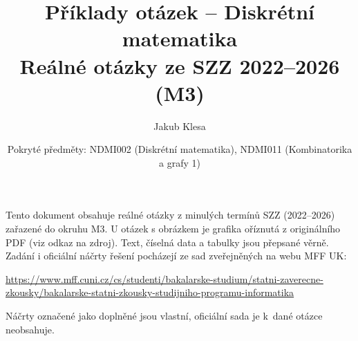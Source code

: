 \documentclass[11pt,a4paper]{article}
\title{Příklady otázek -- Diskrétní matematika\\[0.3em]\large Reálné otázky ze SZZ 2022--2026 (M3)}
\author{Jakub Klesa}
\date{Pokryté předměty: NDMI002 (Diskrétní matematika), NDMI011 (Kombinatorika a grafy 1)}
\begin{document}
\maketitle
\tableofcontents
\bigskip

\begin{poznamka}
Tento dokument obsahuje reálné otázky z minulých termínů SZZ (2022--2026) zařazené do
okruhu M3. U otázek s obrázkem je grafika oříznutá z originálního PDF (viz odkaz na
zdroj). Text, číselná data a tabulky jsou přepsané věrně.
Zadání i oficiální náčrty řešení pocházejí ze sad zveřejněných na webu MFF UK:\par
{\raggedright\url{https://www.mff.cuni.cz/cs/studenti/bakalarske-studium/statni-zaverecne-zkousky/bakalarske-statni-zkousky-studijniho-programu-informatika}\par}
Náčrty označené jako doplněné jsou vlastní, oficiální sada je k~dané otázce neobsahuje.
\end{poznamka}
\bigskip



\end{document}
